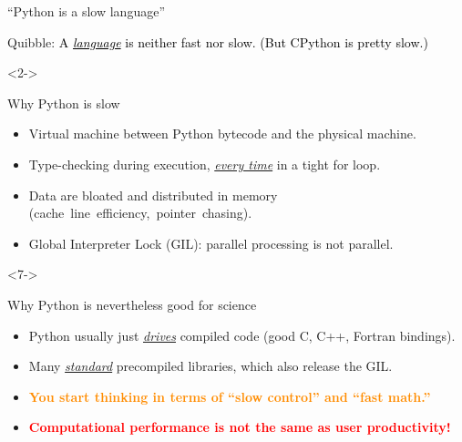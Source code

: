 \documentclass[aspectratio=169]{beamer}
\begin{document}
\begin{frame}{``Python is a slow language''}
\vspace{0.2 cm}
\begin{block}{Quibble: \textcolor{black}{A \underline{\it language} is neither fast nor slow. (But CPython is pretty slow.)}}
\end{block}

\begin{uncoverenv}<2->
\vspace{-0.2 cm}
\begin{block}{Why Python is slow}
\begin{itemize}
\item<3-> Virtual machine between Python bytecode and the physical machine.
\item<4-> Type-checking during execution, \underline{\it every time} in a tight for loop.
\item<5-> Data are bloated and distributed in memory \mbox{(cache line efficiency, pointer chasing).\hspace{-0.5 cm}}
\item<6-> Global Interpreter Lock (GIL): parallel processing is not parallel.
\end{itemize}
\end{block}
\end{uncoverenv}

\begin{uncoverenv}<7->
\begin{block}{Why Python is nevertheless good for science}
\begin{itemize}
\item<8-> Python usually just \underline{\it drives} compiled code (good C, C++, Fortran bindings).
\item<9-> Many \underline{\it standard} precompiled libraries, which also release the GIL.
\item<10-> \textcolor{darkorange}{\bf You start thinking in terms of ``slow control'' and ``fast math.''}
\item<11-> \textcolor{red}{\bf Computational performance is not the same as user productivity!}
\end{itemize}
\end{block}
\end{uncoverenv}
\end{frame}
\end{document}
